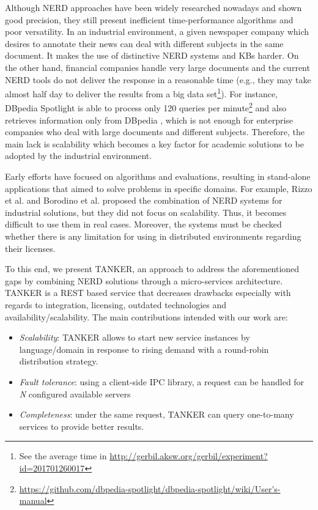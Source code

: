 \documentclass{sig-alternate}
\begin{document}
Although NERD approaches have been widely researched nowadays and shown good precision, they still present inefficient time-performance algorithms and poor versatility. In an industrial environment, a given newspaper company which desires to annotate their news can deal with different subjects in the same document. It makes the use of distinctive NERD systems and KBs harder. On the other hand, financial companies handle very large documents and the current NERD tools do not deliver the response in a reasonable time (e.g., they may take almost half day to deliver the results from a big data set\footnote{ See the average time in \url{http://gerbil.aksw.org/gerbil/experiment?id=201701260017}}). For instance, DBpedia Spotlight \cite{_Ref490759726} is able to process only 120 queries per minute\footnote{\url{https://github.com/dbpedia-spotlight/dbpedia-spotlight/wiki/User's-manual}} and also retrieves information only from DBpedia \cite{_Ref490759734}, which is not enough for enterprise companies who deal with large documents and different subjects. Therefore, the main lack is scalability which becomes a key factor for academic solutions to be adopted by the industrial environment.

Early efforts have focused on algorithms and evaluations, resulting in stand-alone applications that aimed to solve problems in specific domains. For example, Rizzo et al.  \cite{_Ref490759749} and Borodino et al.  \cite{_Ref490759761} proposed the combination of NERD systems for industrial solutions, but they did not focus on scalability. Thus, it becomes difficult to use them in real cases. Moreover, the systems must be checked whether there is any limitation for using in distributed environments regarding their licenses.

To this end, we present TANKER, an approach to address the aforementioned gaps by combining NERD solutions through a micro-services architecture. TANKER is a REST based service that decreases drawbacks especially with regards to integration, licensing, outdated technologies and availability/scalability. The main contributions intended with our work are:
\begin{itemize}
\item {\em Scalability}: TANKER allows to start new service instances by language/domain in response to rising demand with a round-robin distribution strategy.
\item {\em Fault tolerance}: using a client-side IPC library, a request can be handled for {\em N} configured available servers
\item {\em Completeness}: under the same request, TANKER can query one-to-many services to provide better results.
\end{itemize}
\end{document}
